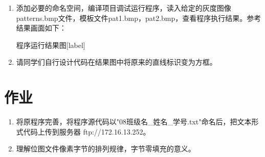 ﻿\documentclass[12pt,a4paper,oneside]{book}
\begin{document}
\begin{enumerate}
\item 添加必要的命名空间，编译项目调试运行程序，读入给定的灰度图像patterns.bmp文件，模板文件pat1.bmp，pat2.bmp，查看程序执行结果。参考结果画面如下：

\begin{Figure}[h]{程序运行结果图}[label]
\end{Figure}

\item 请同学们自行设计代码在结果图中将原来的直线标识变为方框。
\end{enumerate}  
 
        
        

\section{作业}
\begin{enumerate}  
\item 将原程序完善，将程序源代码以"08班级名\_姓名\_学号.txt"命名后，把文本形式代码上传到服务器 ftp://172.16.13.252。 
\item 理解位图文件像素字节的排列规律，字节零填充的意义。
\end{enumerate}   
\end{document}
